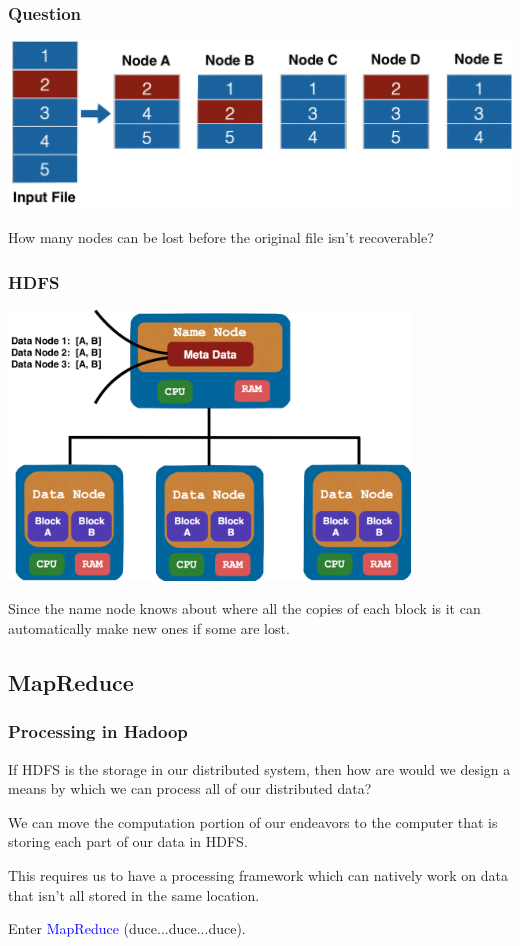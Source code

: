 \documentclass{beamer}
\begin{document}
\begin{frame}
  \frametitle{Question}
  \includegraphics[width=\textwidth]{../images/replication.png}
  \begin{block}{}
    How many nodes can be lost before the original file isn't recoverable?
  \end{block}
\end{frame}

\begin{frame}
  \frametitle{HDFS}
  \centering
  \includegraphics[width=0.8\textwidth]{../images/name_node.png}

  \vspace{4mm}
  \parbox{\linewidth}{Since the name node knows about where all the copies of each block is it can automatically make new ones if some are lost.}
\end{frame}

\subsection{MapReduce}
\begin{frame}
  \frametitle{Processing in Hadoop}
  If HDFS is the storage in our distributed system, then how are would we design a means by which we can process all of our distributed data? \pause
  \vspace{4mm}
  \begin{block}{}
    We can move the computation portion of our endeavors to the computer that is storing each part of our data in HDFS.
  \end{block} \pause
  \vspace{4mm}
  This requires us to have a processing framework which can natively work on data that isn't all stored in the same location. 

  \vspace{4mm}
  \centering   
  Enter \textcolor{blue}{\LARGE MapReduce} ({\LARGE duce...}{\large duce...}{\small duce}).
\end{frame}
\end{document}
